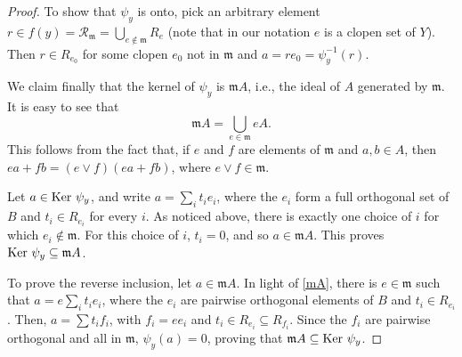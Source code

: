 \documentclass[10pt,a4paper]{amsart}
\def\cal{\mathcal}
\def\ker{{\mbox{\rm{Ker} }}}
\def\m{{\mathfrak m}} %
\begin{document}
\begin{proof}
To show that $\psi_y$ is onto, pick an arbitrary element $r\in f(y)={\cal R}_\m=\bigcup_{e\not \in \m} R_e$ (note that in our notation $e$ is a clopen set of $Y$). Then $r\in R_{e_0}$ for some clopen $e_0$ not in $\m$ and $a=r e_0=\psi_y^{-1}(r)$.


We claim finally that  the kernel of $\psi_y$ is $\m A$, i.e., the ideal of $A$ generated by $\m$.
It is easy to see that 
\begin{equation}\label{mA}
\m A = \bigcup_{e\in \m} eA.
\end{equation}
This follows from the fact that, if $e$ and $f$ are elements of $\m$ and $a, b\in A$, then $ea+fb=(e\vee f)(ea+fb)$, where $e\vee f \in \m$.
  

Let $a \in \ker \psi_y$, and write $a = \sum_i t_ie_i$, where the $e_i$ form a full orthogonal set of $B$ and $t_i \in R_{e_i}$ for every $i$. As noticed above, there is exactly one choice of $i$ for which $e_i \not \in \m$. For this choice of $i$, $t_i=0$, and so $a \in \m A$.  This proves $\ker \psi_y \subseteq \m A$. 

To prove the reverse inclusion, let $a \in \m A$. In light of \eqref{mA}, there is $e\in \m$ such that $a = e  \sum_i t_ie_i$, where the $e_i$ are pairwise orthogonal elements of $B$ and $t_i \in R_{e_i}$. Then, $a=\sum t_i f_i$, with $f_i=ee_i$ and $t_i\in R_{e_i}\subseteq R_{f_i}$. Since the $f_i$ are pairwise orthogonal and  all in $\m$, $\psi_y(a) =0$, proving that $\m A \subseteq \ker \psi_y$.
\end{proof} 
\end{document}
